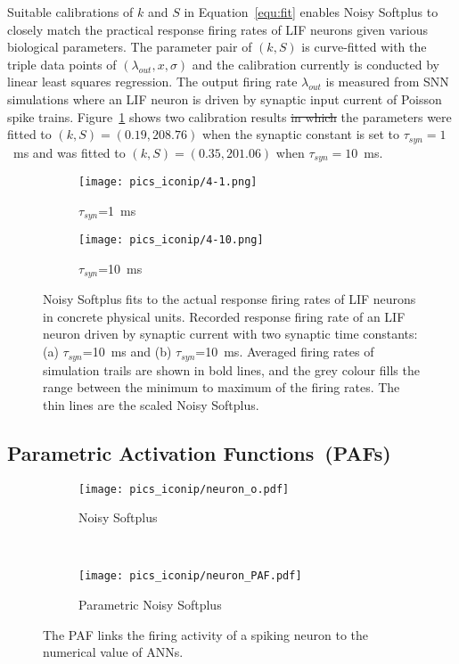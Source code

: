 \documentclass{article}
\providecommand{\DIFaddtex}[1]{{\protect\color{blue}\uwave{#1}}} %
\providecommand{\DIFdeltex}[1]{{\protect\color{red}\sout{#1}}}                      %
\providecommand{\DIFaddbegin}{} %
\providecommand{\DIFaddend}{} %
\providecommand{\DIFdelbegin}{} %
\providecommand{\DIFdelend}{} %
\providecommand{\DIFdelbeginFL}{} %
\providecommand{\DIFdelendFL}{} %
\providecommand{\DIFadd}[1]{\texorpdfstring{\DIFaddtex{#1}}{#1}} %
\providecommand{\DIFdel}[1]{\texorpdfstring{\DIFdeltex{#1}}{}} %
\begin{document}
	
	Suitable calibrations of $k$ and $S$ in Equation~\ref{equ:fit} enables Noisy Softplus to closely match the practical response firing rates of LIF neurons given various biological parameters.
	The parameter pair of $(k, S)$ is curve-fitted with the triple data points of $(\lambda_{out}, x, \sigma)$ and the calibration currently is conducted by linear least squares regression.
	The output firing rate $\lambda_{out}$ is measured from SNN simulations where an LIF neuron is driven by synaptic input current of Poisson spike trains.
	Figure~\ref{Fig:nsptau1} shows two calibration results \DIFdelbegin \DIFdel{in which 
}\DIFdelend \DIFaddbegin \DIFadd{that 
	}\DIFaddend the parameters were fitted to $(k, S)=(0.19,208.76)$ when the synaptic constant is set to $\tau_{syn}=1$~ms and was fitted to $(k, S)=(0.35,201.06)$ when $\tau_{syn}=10$~ms.

	\begin{figure}
		\centering
		\begin{subfigure}[t]{0.49\textwidth}
			\texttt{[image: pics\_iconip/4-1.png]}
			\caption{$\tau_{syn}$=1~ms}
		\end{subfigure}
		\begin{subfigure}[t]{0.49\textwidth}
			\texttt{[image: pics\_iconip/4-10.png]}
			\caption{$\tau_{syn}$=10~ms}
		\end{subfigure}
		\caption{Noisy Softplus fits to the actual response firing rates of LIF neurons in concrete physical units.
			Recorded response firing rate of an LIF neuron driven by synaptic current with two synaptic time constants: (a) $\tau_{syn}$=10~ms and (b) $\tau_{syn}$=10~ms. Averaged firing rates of simulation trails are shown in bold lines, and the grey colour fills the range between the minimum to maximum of the firing rates. The thin lines are the scaled Noisy Softplus.}
		\label{Fig:nsptau1}
	\end{figure}

	\subsection{Parametric Activation Functions~(PAFs)}
	\begin{figure}[tbh!]
		\centering
		\begin{subfigure}[t]{0.49\textwidth}
			\texttt{[image: pics\_iconip/neuron\_o.pdf]}
			\caption{Noisy Softplus}
		\DIFdelbeginFL %
\DIFdelendFL \end{subfigure}~~~
		\begin{subfigure}[t]{0.42\textwidth}
			\texttt{[image: pics\_iconip/neuron\_PAF.pdf]}
			\caption{Parametric Noisy Softplus}
		\DIFdelbeginFL %
\DIFdelendFL \end{subfigure}
		\caption{The PAF links the firing activity of a spiking neuron to the numerical value of ANNs.}
		\label{Fig:tneuron}
	\end{figure}
\end{document}
